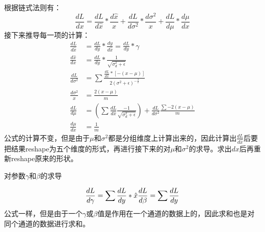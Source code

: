 \documentclass[11pt]{article}
\begin{document}
根据链式法则有： \[
\frac{dL}{dx} = \frac{dL}{d\hat{x}}*\frac{d\hat{x}}{x} + \frac{dL}{d\sigma^2}*\frac{d\sigma^2}{x} + \frac{dL}{d\mu}*\frac{d\mu}{dx}
\] 接下来推导每一项的计算： \[
\begin{align}
\frac{dL}{d\hat{x}} &= \frac{dL}{dy} * \frac{dy}{d\hat{x}} = \frac{dL}{dy} * \gamma\\
\frac{d\hat{x}}{dx} &= \frac{dL}{dy} * \frac{1}{\sqrt{\sigma^2_d+\epsilon}}\\
\frac{dL}{d\sigma^2} &= \sum{\frac{\frac{dL}{d\hat{x}} * [-(x-\mu)]}{2(\sigma^2+\epsilon)^{-\frac{3}{2}}}} \\
\frac{d\sigma^2}{x} &= \frac{2(x-\mu)}{m}\\
\frac{dL}{d\mu} &= (\sum \frac{dL}{d\hat{x}}\frac{-1}{\sqrt{\sigma^2_d+\epsilon}}) + \frac{dL}{d\sigma^2}\frac{\sum -2(x-\mu)}{m}\\
\frac{d\mu}{dx} &= \frac{1}{m}
\end{align}
\]
公式的计算不变，但是由于\(\mu\)和\(\sigma^2\)都是分组维度上计算出来的，因此计算出\(\frac{dL}{d\hat{x}}\)后要把结果reshape为五个维度的形式，再进行接下来的对\(\mu\)和\(\sigma^2\)的求导。求出\(dx\)后再重新reshape原来的形状。

对参数\(\gamma\)和\(\beta\)的求导

\[
\frac{dL}{d\gamma} = \sum\frac{dL}{dy}*\hat{x}\\
\frac{dL}{d\beta} = \sum\frac{dL}{dy}\\
\]
公式一样，但是由于一个\(\gamma\)或\(\beta\)值是作用在一个通道的数据上的，因此求和也是对同个通道的数据进行求和。


    
    
    
    
\end{document}
